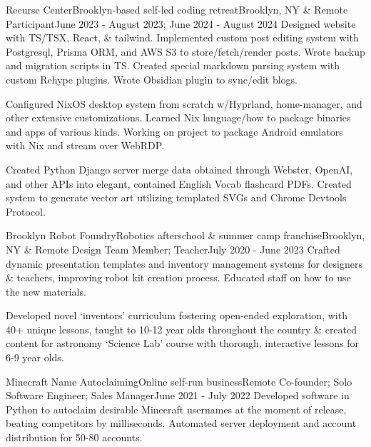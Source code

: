 \documentclass[letterpaper, 10pt]{article}
\begin{document}
\resumeSubheading
{Recurse Center}{Brooklyn-based self-led coding retreat}{Brooklyn, NY \& Remote}
{Participant}{June 2023 - August 2023; June 2024 - August 2024}{}
\resumeItemListStart
{}
{Designed website with TS/TSX, React, \& tailwind. Implemented custom post editing system with Postgresql, Prisma ORM, and AWS S3 to store/fetch/render posts. Wrote backup and migration scripts in TS. Created special markdown parsing system with custom Rehype plugins. Wrote Obsidian plugin to sync/edit blogs.}

{Configured NixOS desktop system from scratch w/Hyprland, home-manager, and other extensive customizations. Learned Nix language/how to package binaries and apps of various kinds. Working on project to package Android emulators with Nix and stream over WebRDP.}

{Created Python Django server merge data obtained through Webster, OpenAI, and other APIs into elegant, contained English Vocab flashcard PDFs. Created system to generate vector art utilizing templated SVGs and Chrome Devtools Protocol.}
\resumeItemListEnd

\resumeSubheading
{Brooklyn Robot Foundry}{Robotics afterschool \& summer camp franchise}{Brooklyn, NY \& Remote}
{Design Team Member; Teacher}{July 2020 - June 2023}{}
\resumeItemListStart
{}
{Crafted dynamic presentation templates and inventory management systems for designers \& teachers, improving robot kit creation process. Educated staff on how to use the new materials.}

{Developed novel `inventors' curriculum fostering open-ended exploration, with 40+ unique lessons, taught to 10-12 year olds throughout the country \& created content for astronomy `Science Lab' course with thorough, interactive lessons for 6-9 year olds.}

\resumeItemListEnd

\resumeSubheading
{Minecraft Name Autoclaiming}{Online self-run business}{Remote}
{Co-founder; Solo Software Engineer; Sales Manager}{June 2021 - July 2022}{}
\resumeItemListStart
{}
{Developed software in Python to autoclaim desirable Minecraft usernames at the moment of release, beating competitors by milliseconds. Automated server deployment and account distribution for 50-80 accounts.}
\end{document}
